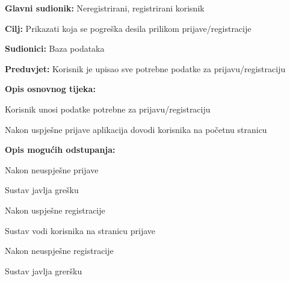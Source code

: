 				\noindent {}
					\begin{packed_item}
	
						\item \textbf{Glavni sudionik: }Neregistrirani, registrirani korisnik
						\item  \textbf{Cilj:} Prikazati koja se pogreška desila prilikom prijave/registracije
						\item  \textbf{Sudionici:} Baza podataka
						\item  \textbf{Preduvjet:} Korisnik je upisao sve potrebne podatke za prijavu/registraciju
						\item  \textbf{Opis osnovnog tijeka:}
						
						\item[] \begin{packed_enum}
	
							\item Korisnik unosi podatke potrebne za prijavu/registraciju
							\item Nakon uspješne prijave aplikacija dovodi korisnika na početnu stranicu
							
						\end{packed_enum}
						
						\item  \textbf{Opis mogućih odstupanja:}
						
						\item[] \begin{packed_item}
							
							\item[2.a] Nakon neuspješne prijave
								\begin{packed_item}
									\item Sustav javlja grešku
								\end{packed_item}
								
							\item[2.b] Nakon uspješne registracije
								\begin{packed_item}
									\item Sustav vodi korisnika na stranicu prijave
									\item[2.b.1] Nakon neuspješne registracije
										\begin{packed_item}
											\item Sustav javlja greršku
										\end{packed_item}
								\end{packed_item}
							
						\end{packed_item}				
					\end{packed_item}
					

